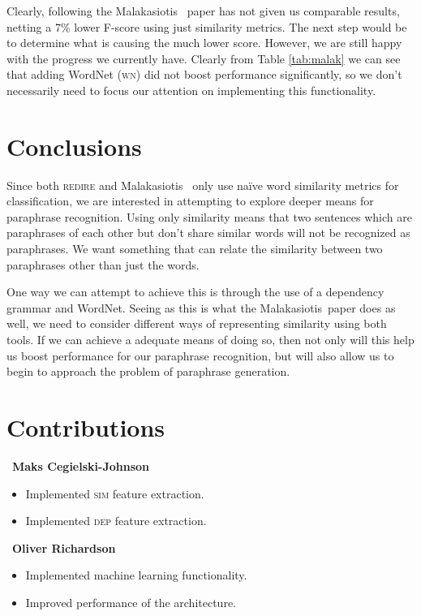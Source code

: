 \documentclass[11pt, reqno]{amsart}
\newcommand{\mala}{Malakasiotis}
\begin{document}
	Clearly, following the \mala~ paper has not given us comparable results, netting a 7\% lower F-score using just similarity metrics. The next step would be to determine what is causing the much lower score. However, we are still happy with the progress we currently have. Clearly from Table \ref{tab:malak} we can see that adding WordNet (\textsc{wn}) did not boost performance significantly, so we don't necessarily need to focus our attention on implementing this functionality.
	\section{Conclusions}
		
	Since both \textsc{redire} and \mala~ only use na\"ive word similarity metrics for classification, we are interested in attempting to explore deeper means for paraphrase recognition. Using only similarity means that two sentences which are paraphrases of each other but don't share similar words will not be recognized as paraphrases. We want something that can relate the similarity between two paraphrases other than just the words. 
	
	One way we can attempt to achieve this is through the use of a dependency grammar and WordNet. Seeing as this is what the \mala~paper does as well, we need to consider different ways of representing similarity using both tools. If we can achieve a adequate means of doing so, then not only will this help us boost performance for our paraphrase recognition, but will also allow us to begin to approach the problem of paraphrase generation.
	
	
	\section{Contributions}
	
	\begin{minipage}{.45\textwidth}
	  ~\textbf{Maks Cegielski-Johnson}
	  \begin{itemize}
	  \item Implemented \textsc{sim} feature extraction.
	  \item Implemented \textsc{dep} feature extraction.
	  \end{itemize}
	\end{minipage}%
	\begin{minipage}{.55\textwidth}
	  ~\textbf{Oliver Richardson}
	  \begin{itemize}
	  \item Implemented machine learning functionality.
	  \item Improved performance of the architecture.
	  \end{itemize}
	\end{minipage}
	
	
	
		
\end{document}
